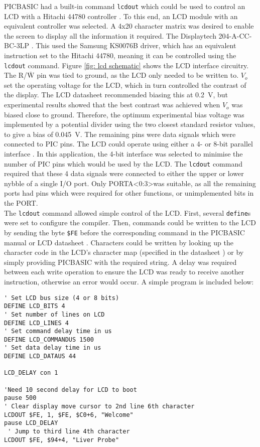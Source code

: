 PICBASIC had a built-in command \verb|lcdout| which could be used to control an LCD with a Hitachi 44780 controller \cite{picbasic_pro}. To this end, an LCD module with an equivalent controller was selected. A 4x20 character matrix was desired to enable the screen to display all the information it required. The Displaytech 204-A-CC-BC-3LP \cite{lcd}. This used the Samsung KS0076B driver, which has an equivalent instruction set to the Hitachi 44780, meaning it can be controlled using the \verb|lcdout| command. Figure \ref{fig: lcd schematic} shows the LCD interface circuitry. The R/$\overline{\text{W}}$ pin was tied to ground, as the LCD only needed to be written to. $V_o$ set the operating voltage for the LCD, which in turn controlled the contrast of the display. The LCD datasheet recommended biasing this at \SI{0.2}{\volt}, but experimental results showed that the best contrast was achieved when $V_o$ was biased close to ground. Therefore, the optimum experimental bias voltage was implemented by a potential divider using the two closest standard resistor values, to give a bias of \SI{0.045}{\volt}. The remaining pins were data signals which were connected to PIC pins. The LCD could operate using either a 4- or 8-bit parallel interface \cite{picbasic_pro}. In this application, the 4-bit interface was selected to minimise the number of PIC pins which would be used by the LCD. The \verb|lcdout| command required that these 4 data signals were connected to either the upper or lower nybble of a single I/O port. Only PORTA\textless0:3\textgreater was suitable, as all the remaining ports had pins which were required for other functions, or unimplemented bits in the PORT.\\

The \verb|lcdout| command allowed simple control of the LCD. First, several \verb|define|s were set to configure the compiler. Then, commands could be written to the LCD by sending the byte \verb|$FE| before the corresponding command in the PICBASIC manual \cite{picbasic_pro} or LCD datasheet \cite{lcd}. Characters could be written by looking up the character code in the LCD's character map (specified in the datasheet \cite{lcd}) or by simply providing PICBASIC with the required string. A delay was required between each write operation to ensure the LCD was ready to receive another instruction, otherwise an error would occur. A simple program is included below:

\begin{lstlisting}
' Set LCD bus size (4 or 8 bits)
DEFINE LCD_BITS 4
' Set number of lines on LCD
DEFINE LCD_LINES 4
' Set command delay time in us
DEFINE LCD_COMMANDUS 1500
' Set data delay time in us
DEFINE LCD_DATAUS 44

LCD_DELAY con 1

'Need 10 second delay for LCD to boot
pause 500            
' Clear display move cursor to 2nd line 6th character
LCDOUT $FE, 1, $FE, $C0+6, "Welcome"         
pause LCD_DELAY
 ' Jump to third line 4th character
LCDOUT $FE, $94+4, "Liver Probe"                
\end{lstlisting}






